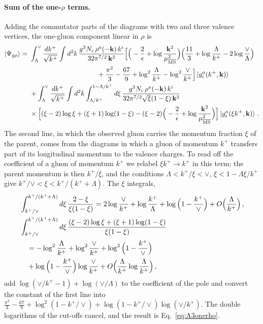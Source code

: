 \paragraph{Sum of the one-$\rho$ terms.} Adding the commutator parts of the diagrams with two and three valence vertices, the one-gluon component linear in $\rho$ is
\begin{align}\label{eq:Psigrho}
\ket{\Psi_{g\rho}}=\ &\int_\Lambda^\vee\frac{dk^+}{\sqrt{k^+}}\int d^2k\,\frac{g^3N_c\,\rho^a(-\v k)\,k^i}{32\pi^{7/2}\,\v k^2}\Big[\Big(-\frac2\epsilon+\log\frac{\v k^2}{\mu^2_{\MS}}\Big)\Big(\frac{11}{3}+\log\frac{\Lambda}{k^+}-2\log\frac{\vee}{\Lambda}\Big)\notag\\&\hspace{3.5cm}+\frac{\pi^2}{3}-\frac{67}{9}+\log^2\frac{\Lambda}{k^+}-\log^2\frac{\vee}{k^+}\Big]\ket{g^a_i(k^+,\v k)}
\notag\\&
+\int_\Lambda^\vee\frac{dk^+}{\sqrt{k^+}}\int d^2k\int_{\Lambda/k^+}^{1-\Lambda/k^+}d\xi\,\frac{g^3N_c\,\rho^a(-\v k)\,k^i}{32\pi^{7/2}\sqrt\xi(1-\xi)\,\v k^2}\notag\\&\times\Big[(\xi-2)\log\xi+(\xi+1)\log(1-\xi)-(\xi-2)\Big(-\frac2\epsilon+\log\frac{\v k^2}{\mu^2_{\MS}}\Big)\Big]\ket{g^a_i(\xi k^+,\v k)}\,.
\end{align}
The second line, in which the observed gluon carries the momentum fraction $\xi$ of the parent, comes from the diagrams in which a gluon of momentum $k^+$ transfers part of its longitudinal momentum to the valence charges. To read off the coefficient of a gluon of momentum $k^+$ we relabel $\xi k^+\to k^+$ in this term; the parent momentum is then $k^+/\xi$, and the conditions $\Lambda<k^+/\xi<\vee$, $\xi<1-\Lambda\xi/k^+$ give $k^+/\vee<\xi<k^+/(k^++\Lambda)$. The $\xi$ integrals,
\begin{align}
&\int_{k^+/\vee}^{k^+/(k^++\Lambda)}d\xi\,\frac{2-\xi}{\xi(1-\xi)}=2\log\frac{\vee}{k^+}+\log\frac{k^+}{\Lambda}+\log\Big(1-\frac{k^+}{\vee}\Big)+O\Big(\frac{\Lambda}{k^+}\Big)\,,\notag\\
&\int_{k^+/\vee}^{k^+/(k^++\Lambda)}d\xi\,\frac{(\xi-2)\log\xi+(\xi+1)\log(1-\xi)}{\xi(1-\xi)}\notag\\&\quad=-\log^2\frac{\Lambda}{k^+}+\log^2\frac{\vee}{k^+}+\log^2\Big(1-\frac{k^+}{\vee}\Big)\notag\\&\quad+\log\Big(1-\frac{k^+}{\vee}\Big)\log\frac{\vee}{k^+}+O\Big(\frac{\Lambda}{k^+}\log\frac{\Lambda}{k^+}\Big)\,,
\end{align}
add $\log(\vee/k^+-1)+\log(\vee/\Lambda)$ to the coefficient of the pole and convert the constant of the first line into $\frac{\pi^2}{3}-\frac{67}{9}+\log^2(1-k^+/\vee)+\log(1-k^+/\vee)\log(\vee/k^+)$. The double logarithms of the cut-offs cancel, and the result is Eq.~\eqref{eq:A3onerho}.

